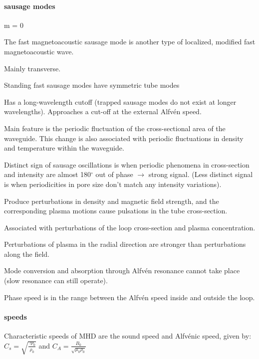\documentclass[12pt]{article}
\begin{document}
\paragraph{sausage modes}
\begin{itemize*}
    \item m = 0
    \item The fast magnetoacoustic sausage mode is another type of
        localized, modified fast magnetoacoustic wave.
    \item Mainly transverse.
    \item Standing fast sausage modes have symmetric tube modes
    \item Has a long-wavelength cutoff (trapped sausage modes do
        not exist at longer wavelengths).
        Approaches a cut-off at the external Alfv\'en speed.
    \item Main feature is the periodic fluctuation of the cross-sectional
        area of the waveguide. This change is also associated with
        periodic fluctuations in density and temperature within the
        waveguide.
    \item Distinct sign of sausage oscillations is when periodic
        phenomena in cross-section and intensity are almost
        180$^{\circ}$ out of phase $\rightarrow$ strong signal.
        (Less distinct signal is when periodicities in pore size
        don't match any intensity variations).
    \item Produce perturbations in density and magnetic field strength,
        and the corresponding plasma motions cause pulsations in the
        tube cross-section.
    \item Associated with perturbations of the loop cross-section
        and plasma concentration.
    \item Perturbations of plasma in the radial direction are stronger
        than perturbations along the field.
    \item Mode conversion and absorption through Alfv\'en resonance
        cannot take place (slow resonance can still operate).
    \item Phase speed is in the range between the Alfv\'en speed inside
        and outside the loop.
\end{itemize*}

\paragraph{speeds}
Characteristic speeds of MHD are the sound speed and Alfv\'enic speed,
given by:
$ C_s = \sqrt{\frac{\gamma p_0}{\rho_0}} $ and
$ C_A = \frac{B_0}{\sqrt{\mu_0\rho_0}} $
\end{document}
